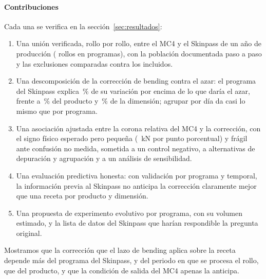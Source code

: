 \paragraph{Contribuciones}
Cada una se verifica en la sección~\ref{sec:resultados}:
\begin{enumerate}
\item Una unión verificada, rollo por rollo, entre el MC4 y el Skinpass de un año de producción
      (\NRollosAnalitica{} rollos en \NProgramas{} programas), con la población documentada paso a paso y las
      exclusiones comparadas contra los incluidos.
\item Una descomposición de la corrección de bending contra el azar: el programa del Skinpass explica
      \ExcesoPrograma{}\,\% de su variación por encima de lo que daría el azar, frente a \ExcesoProducto{}\,\% del producto
      y \ExcesoDimension{}\,\% de la dimensión; agrupar por día da casi lo mismo que por programa.
\item Una asociación ajustada entre la corona relativa del MC4 y la corrección, con el signo físico esperado pero
      pequeña (\PendCorona{}~kN por punto porcentual) y frágil ante confusión no medida, sometida a un control negativo,
      a \NVariantes{} alternativas de depuración y agrupación y a un análisis de sensibilidad.
\item Una evaluación predictiva honesta: con validación por programa y temporal, la información previa al Skinpass no
      anticipa la corrección claramente mejor que una receta por producto y dimensión.
\item Una propuesta de experimento evolutivo por programa, con su volumen estimado, y la lista de datos del Skinpass
      que harían respondible la pregunta original.
\end{enumerate}
Mostramos que la corrección que el lazo de bending aplica sobre la receta depende más del programa del Skinpass, y del
periodo en que se procesa el rollo, que del producto, y que la condición de salida del MC4 apenas la anticipa.
